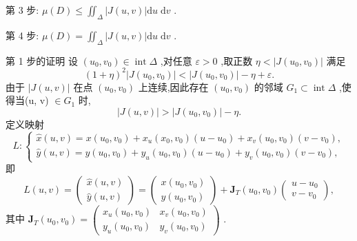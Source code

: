 第 3 步: \(\mu \left( D\right)  \leq  {\iint }_{\Delta }\left| {J\left( {u,v}\right) }\right| \mathrm{d}u\mathrm{\;d}v\) .

第 4 步: \(\mu \left( D\right)  = {\iint }_{\Delta }\left| {J\left( {u,v}\right) }\right| \mathrm{d}u\mathrm{\;d}v\) .

第 1 步的证明 设 \(\left( {{u}_{0},{v}_{0}}\right)  \in  \operatorname{int}\Delta\) ,对任意 \(\varepsilon  > 0\) ,取正数 \(\eta  < \left| {J\left( {{u}_{0},{v}_{0}}\right) }\right|\) 满足
\[
{\left( 1 + \eta \right) }^{2}\left| {J\left( {{u}_{0},{v}_{0}}\right) }\right|  < \left| {J\left( {{u}_{0},{v}_{0}}\right) }\right|  - \eta  + \varepsilon .
\]
由于 \(\left| {J\left( {u,v}\right) }\right|\) 在点 \(\left( {{u}_{0},{v}_{0}}\right)\) 上连续,因此存在 \(\left( {{u}_{0},{v}_{0}}\right)\) 的邻域 \({G}_{1} \subset  \operatorname{int}\Delta\) ,使得当(u, v) \(\in  {G}_{1}\) 时,
\[
\left| {J\left( {u,v}\right) }\right|  > \left| {J\left( {{u}_{0},{v}_{0}}\right) }\right|  - \eta .
\]
定义映射
\[
L : \left\{  \begin{array}{l} \widehat{x}\left( {u,v}\right)  = x\left( {{u}_{0},{v}_{0}}\right)  + {x}_{u}\left( {{x}_{0},{v}_{0}}\right) \left( {u - {u}_{0}}\right)  + {x}_{v}\left( {{u}_{0},{v}_{0}}\right) \left( {v - {v}_{0}}\right) , \\  \widehat{y}\left( {u,v}\right)  = y\left( {{u}_{0},{v}_{0}}\right)  + {y}_{u}\left( {{u}_{0},{v}_{0}}\right) \left( {u - {u}_{0}}\right)  + {y}_{v}\left( {{u}_{0},{v}_{0}}\right) \left( {v - {v}_{0}}\right) , \end{array}\right.
\]
即
\[
L\left( {u,v}\right)  = \left( \begin{array}{l} \widehat{x}\left( {u,v}\right) \\  \widehat{y}\left( {u,v}\right)  \end{array}\right)  = \left( \begin{array}{l} x\left( {{u}_{0},{v}_{0}}\right) \\  y\left( {{u}_{0},{v}_{0}}\right)  \end{array}\right)  + {\mathbf{J}}_{T}\left( {{u}_{0},{v}_{0}}\right) \left( \begin{array}{l} u - {u}_{0} \\  v - {v}_{0} \end{array}\right) ,
\]
其中 \({\mathbf{J}}_{T}\left( {{u}_{0},{v}_{0}}\right)  = \left( \begin{array}{ll} {x}_{u}\left( {{u}_{0},{v}_{0}}\right) & {x}_{v}\left( {{u}_{0},{v}_{0}}\right) \\  {y}_{u}\left( {{u}_{0},{v}_{0}}\right) & {y}_{v}\left( {{u}_{0},{v}_{0}}\right)  \end{array}\right)\) .

